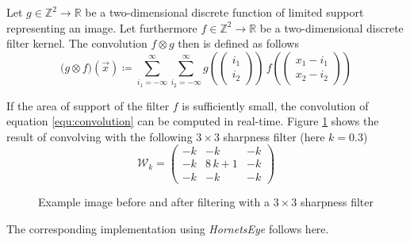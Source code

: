 \documentclass[a4paper,12pt]{book}
\begin{document}
Let $g\in\mathbb{Z}^2\to\mathbb{R}$ be a two-dimensional discrete function
of limited support representing an image. Let furthermore
$f\in\mathbb{Z}^2\to\mathbb{R}$ be a two-dimensional discrete filter kernel.
The convolution $f\otimes g$ then is defined as follows
\begin{equation}\label{equ:convolution}
  \displaystyle\big(g\otimes f\big)(\vec{x})\coloneqq
  \sum_{i_1=-\infty}^{\infty}
  \sum_{i_2=-\infty}^{\infty}
  g\left(\begin{pmatrix}i_1\\i_2\end{pmatrix}\right)\,
  f\left(\begin{pmatrix}x_1-i_1\\x_2-i_2\end{pmatrix}\right)
\end{equation}

If the area of support of the filter $f$ is sufficiently small, the
convolution of equation \ref{equ:convolution} can be computed in real-time.
Figure \ref{fig:sharpen} shows the result of convolving with the
following $3\times 3$ sharpness filter (here $k=0.3$)
\begin{equation*}
  \mathcal{W}_k=
  \begin{pmatrix}-k&-k&-k\\-k&8\,k+1&-k\\-k&-k&-k\end{pmatrix}
\end{equation*}
\begin{figure}[htbp]
   \begin{center}
     \begin{minipage}[c]{.45\textwidth}
     \end{minipage}
     \begin{minipage}[c]{.45\textwidth}
     \end{minipage}
     \caption{Example image before and after filtering with a $3\times 3$
       sharpness filter\label{fig:sharpen}}
   \end{center}
\end{figure}

The corresponding implementation using \emph{HornetsEye} follows here.
\begin{scriptsize}
  
\end{scriptsize}
\end{document}
